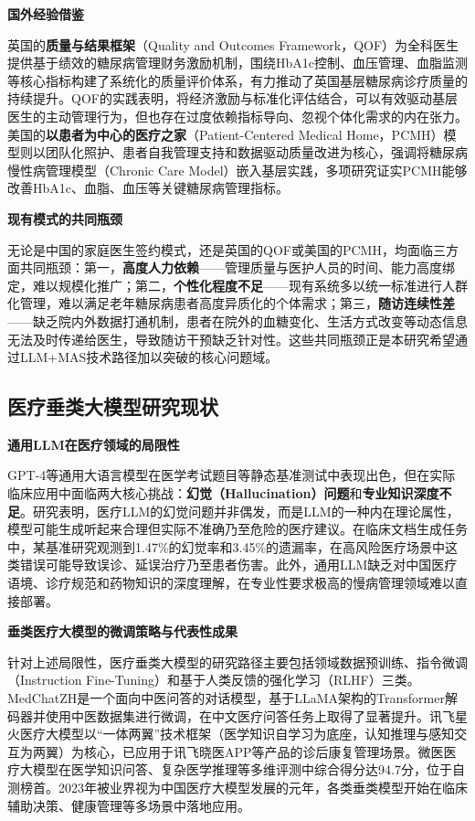 \noindent\textbf{国外经验借鉴}

英国的\textbf{质量与结果框架}（Quality and Outcomes Framework，QOF）为全科医生提供基于绩效的糖尿病管理财务激励机制，围绕HbA1c控制、血压管理、血脂监测等核心指标构建了系统化的质量评价体系，有力推动了英国基层糖尿病诊疗质量的持续提升。QOF的实践表明，将经济激励与标准化评估结合，可以有效驱动基层医生的主动管理行为，但也存在过度依赖指标导向、忽视个体化需求的内在张力。美国的\textbf{以患者为中心的医疗之家}（Patient-Centered Medical Home，PCMH）模型则以团队化照护、患者自我管理支持和数据驱动质量改进为核心，强调将糖尿病慢性病管理模型（Chronic Care Model）嵌入基层实践，多项研究证实PCMH能够改善HbA1c、血脂、血压等关键糖尿病管理指标\todocite{}\todocite{}\todocite{}\todocite{}\todocite{}\todocite{}。

\noindent\textbf{现有模式的共同瓶颈}

无论是中国的家庭医生签约模式，还是英国的QOF或美国的PCMH，均面临三方面共同瓶颈：第一，\textbf{高度人力依赖}------管理质量与医护人员的时间、能力高度绑定，难以规模化推广；第二，\textbf{个性化程度不足}------现有系统多以统一标准进行人群化管理，难以满足老年糖尿病患者高度异质化的个体需求；第三，\textbf{随访连续性差}------缺乏院内外数据打通机制，患者在院外的血糖变化、生活方式改变等动态信息无法及时传递给医生，导致随访干预缺乏针对性。这些共同瓶颈正是本研究希望通过LLM+MAS技术路径加以突破的核心问题域\todocite{}。

\subsection{医疗垂类大模型研究现状}

\noindent\textbf{通用LLM在医疗领域的局限性}

GPT-4等通用大语言模型在医学考试题目等静态基准测试中表现出色，但在实际临床应用中面临两大核心挑战：\textbf{幻觉（Hallucination）问题}和\textbf{专业知识深度不足}。研究表明，医疗LLM的幻觉问题并非偶发，而是LLM的一种内在理论属性，模型可能生成听起来合理但实际不准确乃至危险的医疗建议。在临床文档生成任务中，某基准研究观测到1.47\%的幻觉率和3.45\%的遗漏率，在高风险医疗场景中这类错误可能导致误诊、延误治疗乃至患者伤害。此外，通用LLM缺乏对中国医疗语境、诊疗规范和药物知识的深度理解，在专业性要求极高的慢病管理领域难以直接部署\todocite{}\todocite{}\todocite{}。

\noindent\textbf{垂类医疗大模型的微调策略与代表性成果}

针对上述局限性，医疗垂类大模型的研究路径主要包括领域数据预训练、指令微调（Instruction Fine-Tuning）和基于人类反馈的强化学习（RLHF）三类。MedChatZH是一个面向中医问答的对话模型，基于LLaMA架构的Transformer解码器并使用中医数据集进行微调，在中文医疗问答任务上取得了显著提升。讯飞星火医疗大模型以``一体两翼''技术框架（医学知识自学习为底座，认知推理与感知交互为两翼）为核心，已应用于讯飞晓医APP等产品的诊后康复管理场景。微医医疗大模型在医学知识问答、复杂医学推理等多维评测中综合得分达94.7分，位于自测榜首。2023年被业界视为中国医疗大模型发展的元年，各类垂类模型开始在临床辅助决策、健康管理等多场景中落地应用\todocite{}\todocite{}\todocite{}\todocite{}\todocite{}。

